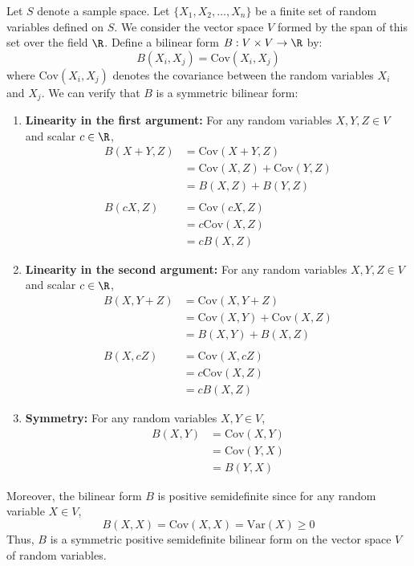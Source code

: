 \documentclass[openany]{book}
\begin{document}
\begin{example}
    Let $S$ denote a sample space. Let $\{X_1, X_2, \ldots, X_n\}$ be a finite set of random variables defined on $S$. We consider the vector space $V$ formed by the span of this set over the field $\R$. Define a bilinear form $B: V \times V \to \R$ by:
    $$B(X_i, X_j) = \text{Cov}(X_i, X_j)$$
    where $\text{Cov}(X_i, X_j)$ denotes the covariance between the random variables $X_i$ and $X_j$. We can verify that $B$ is a symmetric bilinear form:
    \begin{enumerate}
        \item \textbf{Linearity in the first argument:} For any random variables $X, Y, Z \in V$ and scalar $c \in \R$,
        \[\begin{aligned}
        B(X + Y, Z) &= \text{Cov}(X + Y, Z) \\
        &= \text{Cov}(X, Z) + \text{Cov}(Y, Z) \\
        &= B(X, Z) + B(Y, Z) \\ \\
        B(cX, Z) &= \text{Cov}(cX, Z) \\
        &= c\text{Cov}(X, Z) \\
        &= cB(X, Z)
        \end{aligned}\]
        \item \textbf{Linearity in the second argument:} For any random variables $X, Y, Z \in V$ and scalar $c \in \R$,
        \[\begin{aligned}
        B(X, Y + Z) &= \text{Cov}(X, Y + Z) \\
        &= \text{Cov}(X, Y) + \text{Cov}(X, Z) \\
        &= B(X, Y) + B(X, Z) \\ \\
        B(X, cZ) &= \text{Cov}(X, cZ) \\
        &= c\text{Cov}(X, Z) \\
        &= cB(X, Z)
        \end{aligned}\]
        \item \textbf{Symmetry:} For any random variables $X, Y \in V$,
        \[\begin{aligned}
        B(X, Y) &= \text{Cov}(X, Y) \\
        &= \text{Cov}(Y, X) \\
        &= B(Y, X)
        \end{aligned}\]
    \end{enumerate}
    Moreover, the bilinear form $B$ is positive semidefinite since for any random variable $X \in V$,
    $$B(X, X) = \text{Cov}(X, X) = \text{Var}(X) \geq 0$$
    Thus, $B$ is a symmetric positive semidefinite bilinear form on the vector space $V$ of random variables.
\end{example}
\end{document}
